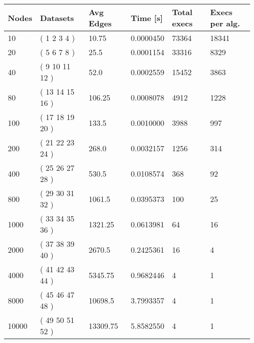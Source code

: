 \begin{longtable}{llllll}
    \textbf{Nodes} & \textbf{Datasets} & \textbf{Avg Edges} & \textbf{Time [s]} & \textbf{Total execs} & \textbf{Execs per alg.} \\
    \endhead
    10             & ( 1 2 3 4 )       & 10.75                  & 0.0000450        & 73364                     & 18341                             \\
    20             & ( 5 6 7 8 )       & 25.5                   & 0.0001154        & 33316                     & 8329                              \\
    40             & ( 9 10 11 12 )    & 52.0                   & 0.0002559        & 15452                     & 3863                              \\
    80             & ( 13 14 15 16 )   & 106.25                 & 0.0008078        & 4912                      & 1228                              \\
    100            & ( 17 18 19 20 )   & 133.5                  & 0.0010000        & 3988                      & 997                               \\
    200            & ( 21 22 23 24 )   & 268.0                  & 0.0032157        & 1256                      & 314                               \\
    400            & ( 25 26 27 28 )   & 530.5                  & 0.0108574        & 368                       & 92                                \\
    800            & ( 29 30 31 32 )   & 1061.5                 & 0.0395373        & 100                       & 25                                \\
    1000           & ( 33 34 35 36 )   & 1321.25                & 0.0613981        & 64                        & 16                                \\
    2000           & ( 37 38 39 40 )   & 2670.5                 & 0.2425361        & 16                        & 4                                 \\
    4000           & ( 41 42 43 44 )   & 5345.75                & 0.9682446        & 4                         & 1                                 \\
    8000           & ( 45 46 47 48 )   & 10698.5                & 3.7993357        & 4                         & 1                                 \\
    10000          & ( 49 50 51 52 )   & 13309.75               & 5.8582550        & 4                         & 1                                 \\

\end{longtable}
